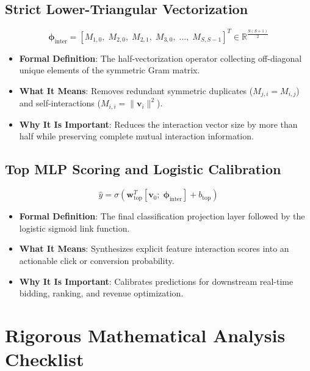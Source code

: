 \documentclass[11pt,a4paper]{article}
\theoremstyle{definition}
\begin{document}
\subsection{Strict Lower-Triangular Vectorization}
{\boldmath
\begin{equation}
\boldsymbol{\phi}_{\text{inter}} = [M_{1, 0}, \; M_{2, 0}, \; M_{2, 1}, \; M_{3, 0}, \; \dots, \; M_{S, S-1}]^T \in \mathbb{R}^{\frac{S(S+1)}{2}}
\end{equation}
}
\begin{itemize}
    \item \textbf{Formal Definition}: The half-vectorization operator collecting off-diagonal unique elements of the symmetric Gram matrix.
    \item \textbf{What It Means}: Removes redundant symmetric duplicates ($M_{j, i} = M_{i, j}$) and self-interactions ($M_{i, i} = \|\mathbf{v}_i\|^2$).
    \item \textbf{Why It Is Important}: Reduces the interaction vector size by more than half while preserving complete mutual interaction information.
\end{itemize}

\subsection{Top MLP Scoring and Logistic Calibration}
{\boldmath
\begin{equation}
\widehat{y} = \sigma\left( \mathbf{w}_{\text{top}}^T [\mathbf{v}_0; \; \boldsymbol{\phi}_{\text{inter}}] + b_{\text{top}} \right)
\end{equation}
}
\begin{itemize}
    \item \textbf{Formal Definition}: The final classification projection layer followed by the logistic sigmoid link function.
    \item \textbf{What It Means}: Synthesizes explicit feature interaction scores into an actionable click or conversion probability.
    \item \textbf{Why It Is Important}: Calibrates predictions for downstream real-time bidding, ranking, and revenue optimization.
\end{itemize}

\section{Rigorous Mathematical Analysis Checklist}
\end{document}
